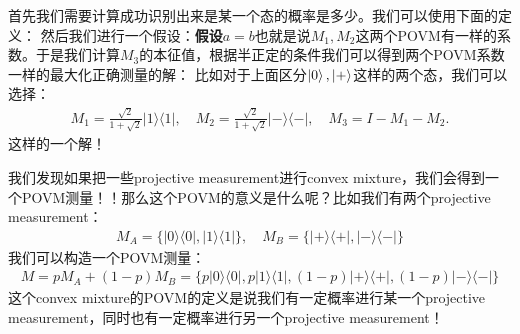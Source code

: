 首先我们需要计算成功识别出来是某一个态的概率是多少。我们可以使用下面的定义：
然后我们进行一个假设：\textbf{假设$ a = b $}也就是说$ M_1, M_2 $这两个POVM有一样的系数。于是我们计算$
M_3 $的本征值，根据半正定的条件我们可以得到两个POVM系数一样的最大化正确测量的解：
比如对于上面区分$ \left| 0 \right\rangle, \left| + \right\rangle $这样的两个态，我们可以选择：
\begin{align}
  M_1=\frac{\sqrt{2}}{1+\sqrt{2}}|1\rangle\langle1|,\quad
  M_2=\frac{\sqrt{2}}{1+\sqrt{2}}|-\rangle\langle-|,\quad M_3=I-M_1-M_2.
\end{align}
这样的一个解！

\bigskip
{}

我们发现如果把一些projective measurement进行convex
mixture，我们会得到一个POVM测量！！那么这个POVM的意义是什么呢？比如我们有两个projective measurement：
\begin{align}
  M_A = \{ |0\rangle\langle0|, |1\rangle\langle1| \}, \quad M_B = \{
  |+\rangle\langle+|, |-\rangle\langle-| \}
\end{align}
我们可以构造一个POVM测量：
\begin{align}
  M = p M_A + (1-p) M_B = \{ p|0\rangle\langle0|,
  p|1\rangle\langle1|, (1-p)|+\rangle\langle+|, (1-p)|-\rangle\langle-| \}
\end{align}
这个convex mixture的POVM的定义是说我们有一定概率进行某一个projective
measurement，同时也有一定概率进行另一个projective measurement！

